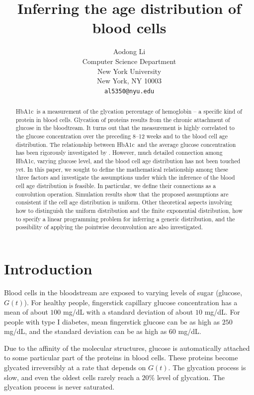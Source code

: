 \documentclass{article}
\title{Inferring the age distribution of blood cells}
\author{
  Aodong Li\\  
  Computer Science Department\\
  New York University\\
  New York, NY 10003 \\
  \texttt{al5350@nyu.edu} \\
}
\newcommand{\hba}{\textrm{HbA1c}}
\begin{document}

\maketitle

\begin{abstract}
\hba\ is a measurement of the glycation percentage of hemoglobin  -- a specific kind of protein in blood cells. Glycation of proteins results from the chronic attachment of glucose in the bloodtream. It turns out that the measurement is highly correlated to the glucose concentration over the preceding 8--12 weeks and to the blood cell age distribution.
The relationship between \hba\ and the average glucose concentration has been rigorously investigated by \citet{nathan2008translating}. However, much detailed connection among \hba, varying glucose level, and the blood cell age distribution has not been touched yet. In this paper, we sought to define the mathematical relationship among these three factors and investigate the assumptions under which the inference of the blood cell age distribution is feasible. In particular, we define their connections as a convolution operation. Simulation results show that the proposed assumptions are consistent if the cell age distribution is uniform. Other theoretical aspects involving how to distinguish the uniform distribution and the finite exponential distribution, how to specify a linear programming problem for inferring a generic distribution, and the possibility of applying the pointwise deconvolution
 are also investigated.
\end{abstract}

\section{Introduction}

Blood cells in the bloodstream are exposed to varying levels of sugar (glucose, $G(t)$). For healthy people, fingerstick capillary glucose concentration  has a mean of about $100$ mg/dL with a standard deviation of about $10$ mg/dL.  For people with type I diabetes, mean fingerstick glucose can be as high as $250$ mg/dL, and the standard deviation can be as high as $60$ mg/dL.

Due to the affinity of the molecular structures, glucose is automatically attached to some particular part of the proteins in blood cells. These proteins become glycated irreversibly at a rate that depends on $G(t)$. The glycation process is slow, and even the oldest cells rarely reach a $20\%$ level of glycation. The glycation process is never saturated.
\end{document}
